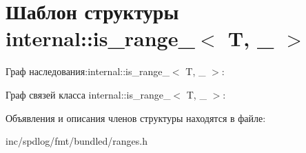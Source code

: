 \hypertarget{structinternal_1_1is__range__}{}\section{Шаблон структуры internal\+:\+:is\+\_\+range\+\_\+$<$ T, \+\_\+ $>$}
\label{structinternal_1_1is__range__}


Граф наследования\+:internal\+:\+:is\+\_\+range\+\_\+$<$ T, \+\_\+ $>$\+:


Граф связей класса internal\+:\+:is\+\_\+range\+\_\+$<$ T, \+\_\+ $>$\+:


Объявления и описания членов структуры находятся в файле\+:\begin{DoxyCompactItemize}
\item 
inc/spdlog/fmt/bundled/ranges.\+h\end{DoxyCompactItemize}

